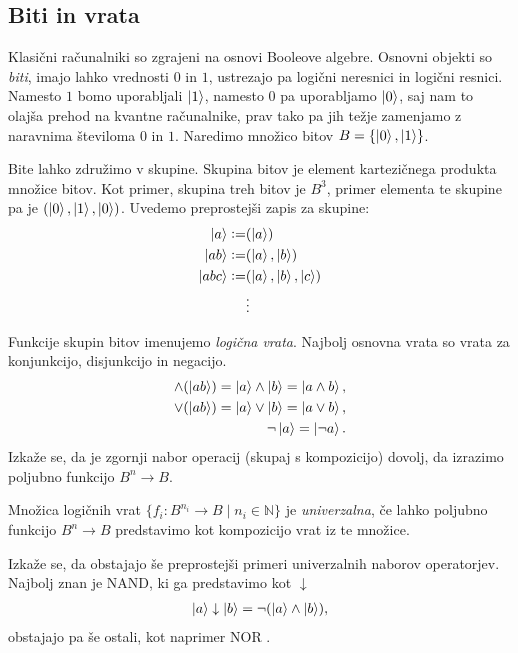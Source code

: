 \documentclass[mat1]{fmfdelo}
\newcommand{\N}{\mathbb N}
\newcommand{\defeq}{\vcentcolon=}
\begin{document}
\subsection{Biti in vrata}
Klasični računalniki so zgrajeni na osnovi Booleove algebre. Osnovni objekti so \emph{biti}, imajo lahko vrednosti \(0\) in \(1\), ustrezajo pa logični neresnici in logični resnici. Namesto \(1\) bomo uporabljali \(\ket{1}\), namesto \(0\) pa uporabljamo \(\ket{0}\), saj nam to olajša prehod na kvantne računalnike, prav tako pa jih težje zamenjamo z naravnima številoma \(0\) in \(1\). Naredimo množico bitov \(B = \{\ket0, \ket1\}\).

Bite lahko združimo v skupine. Skupina bitov je element kartezičnega produkta množice bitov. Kot primer, skupina treh bitov je \(B^3\), primer elementa te skupine pa je \((\ket0, \ket1, \ket0)\). Uvedemo preprostejši zapis za skupine: 
\begin{align*}
    \ket{a} \defeq& (\ket a)\\
    \ket{ab} \defeq& (\ket{a},\ket b)\\
    \ket{abc} \defeq& (\ket a, \ket b, \ket c)\\
    &\vdots
\end{align*}

Funkcije skupin bitov imenujemo \emph{logična vrata}. Najbolj osnovna vrata so vrata za konjunkcijo, disjunkcijo in negacijo.
\begin{align*}
    \land(\ket{ab}) = \ket{a}\land\ket{b} = \ket{a\land b},\\
    \lor(\ket{ab}) = \ket{a}\lor\ket{b} = \ket{a\lor b},\\
    \lnot\ket{a} = \ket{\lnot a}.
\end{align*}
Izkaže se, da je zgornji nabor operacij (skupaj s kompozicijo) dovolj, da izrazimo poljubno funkcijo \(B^n\to B\).
\begin{definicija}
    Množica logičnih vrat \(\{f_i: B^{n_i}\to B \mid n_i\in \N\}\) je \emph{univerzalna}, če lahko poljubno funkcijo \(B^n\to B\) predstavimo kot kompozicijo vrat iz te množice.
\end{definicija}
Izkaže se, da obstajajo še preprostejši primeri univerzalnih naborov operatorjev. Najbolj znan je \textsf{NAND}, ki ga predstavimo kot \(\downarrow\)
\begin{align*}
    \ket{a}\downarrow \ket{b} = \lnot (\ket{a} \land \ket{b}),
\end{align*}
obstajajo pa še ostali, kot naprimer \textsf{NOR} \cite{sheffers}.
\end{document}
